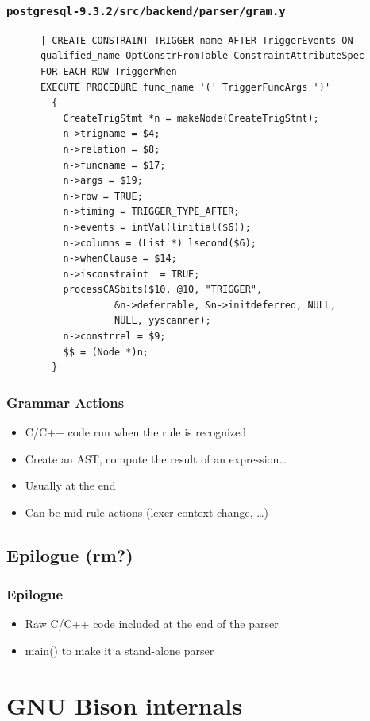 \documentclass{beamer}
\begin{document}
\begin{frame}[fragile,shrink=25]
  \frametitle{\texttt{postgresql-9.3.2/src/backend/parser/gram.y}}
\begin{verbatim}
      | CREATE CONSTRAINT TRIGGER name AFTER TriggerEvents ON
      qualified_name OptConstrFromTable ConstraintAttributeSpec
      FOR EACH ROW TriggerWhen
      EXECUTE PROCEDURE func_name '(' TriggerFuncArgs ')'
        {
          CreateTrigStmt *n = makeNode(CreateTrigStmt);
          n->trigname = $4;
          n->relation = $8;
          n->funcname = $17;
          n->args = $19;
          n->row = TRUE;
          n->timing = TRIGGER_TYPE_AFTER;
          n->events = intVal(linitial($6));
          n->columns = (List *) lsecond($6);
          n->whenClause = $14;
          n->isconstraint  = TRUE;
          processCASbits($10, @10, "TRIGGER",
                   &n->deferrable, &n->initdeferred, NULL,
                   NULL, yyscanner);
          n->constrrel = $9;
          $$ = (Node *)n;
        }
\end{verbatim}
\end{frame}


\begin{frame}
  \frametitle{Grammar Actions}
    \begin{itemize}
      \item C/C++ code run when the rule is recognized
      \item Create an AST, compute the result of an expression\ldots
      \item Usually at the end
      \item Can be mid-rule actions (lexer context change, \ldots)
    \end{itemize}
\end{frame}

\subsection{Epilogue (rm?)}

\begin{frame}
  \frametitle{Epilogue}
    \begin{itemize}
      \item Raw C/C++ code included at the end of the parser
      \item main() to make it a stand-alone parser
    \end{itemize}
\end{frame}

\section{GNU Bison internals}
\end{document}
